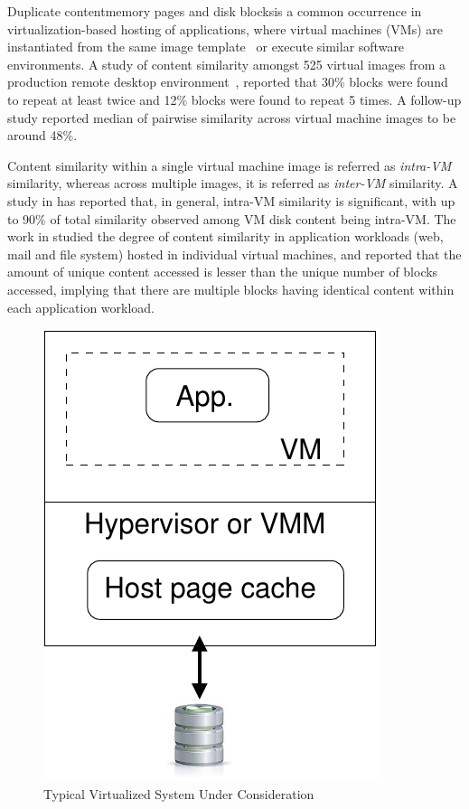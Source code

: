 
Duplicate content\textemdash{}memory pages and disk blocks\textemdash{}is a common
occurrence in virtualization-based hosting of applications, where
virtual machines (VMs) are instantiated from the same image 
template~\cite{effectiveness} or execute similar software environments. 
A study of content similarity amongst 525
virtual images from a production remote desktop environment~\cite{similarity}, 
reported that
30\% blocks were found to repeat at least twice and 12\% blocks were
found to repeat 5 times. A follow-up study\cite{vdn}
reported median of pairwise similarity across
virtual machine images to be around 48\%.

Content similarity within a single virtual machine image is referred
as \textit{intra-VM} similarity, whereas across multiple images, it is
referred as \textit{inter-VM} similarity.
A study in \cite{intra-higherthan-inter} has reported that, in general,
intra-VM similarity is significant, with up to 90\% of total similarity 
observed among VM disk content being intra-VM.
The work in \cite{iodedup} studied the degree of content similarity
in application workloads (web, mail and file system) hosted in 
individual virtual machines,
and reported that the amount of unique content accessed is lesser
than the unique number of blocks accessed, implying that there are multiple 
blocks having identical content within each application workload.

\begin{figure}[t]
\centering
\includegraphics[scale=0.65]{confided-figures/main/system-under-considerat.pdf}
\vspace{-0.15in}
\caption{Typical Virtualized System Under Consideration}
\label{fig:system-under-considerat}
\end{figure}

